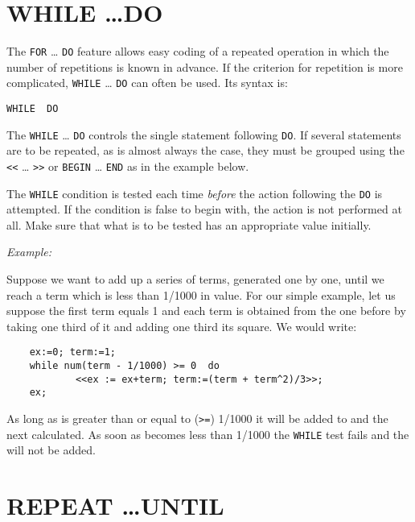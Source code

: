 \section{WHILE \ldots DO}
\hypertarget{command:WHILE}{}

The \texttt{FOR} \ldots{} \texttt{DO} feature
allows easy coding of a repeated operation in which the number of repetitions
is known in advance.  If the criterion for repetition is more complicated,
\texttt{WHILE} \ldots{} \texttt{DO} can often be used.  Its syntax is:
\begin{syntax}
  \texttt{WHILE }\texttt{ DO }
\end{syntax}
The \texttt{WHILE} \ldots{} \texttt{DO} controls the single statement
following \texttt{DO}.
If several statements are to be repeated, as is almost always the case,
they must be grouped using the \texttt{<}\texttt{<} \ldots{} \texttt{>}\texttt{>} 
or \texttt{BEGIN} \ldots{} \texttt{END}
as in the example below.

The \texttt{WHILE} condition is tested each time \emph{before} the action
following the \texttt{DO} is attempted.  If the condition is false to begin
with, the action is not performed at all.  Make sure that what is to be
tested has an appropriate value initially.

\textit{Example:}

Suppose we want to add up a series of terms, generated one by one, until
we reach a term which is less than 1/1000 in value.  For our simple
example, let us suppose the first term equals 1 and each term is obtained
from the one before by taking one third of it and adding one third its
square. We would write:
\begin{verbatim}
    ex:=0; term:=1;
    while num(term - 1/1000) >= 0  do
            <<ex := ex+term; term:=(term + term^2)/3>>;
    ex;
\end{verbatim}
As long as  is greater than or equal to (\texttt{>=}) 1/1000 it will
be added to  and the next  calculated.  As soon as
 becomes less than 1/1000 the \texttt{WHILE} test fails and the
 will not be added.


\section{REPEAT \ldots UNTIL}
\hypertarget{command:REPEAT}{}
\hypertarget{reserved:UNTIL}{}

